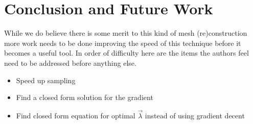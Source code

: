 \documentclass[sigconf]{acmart}
\begin{document}
\section{Conclusion and Future Work}
While we do believe there is some merit to this kind of mesh (re)construction more work needs to be done improving the speed of this technique before it becomes a useful tool. In order of difficulty here are the items the authors feel need to be addressed before anything else.
 
\begin{itemize}
\item Speed up sampling
\item Find a closed form solution for the gradient
\item Find closed form equation for optimal $\vec{\lambda}$ instead of using gradient decent
\end{itemize}


 
\end{document}
